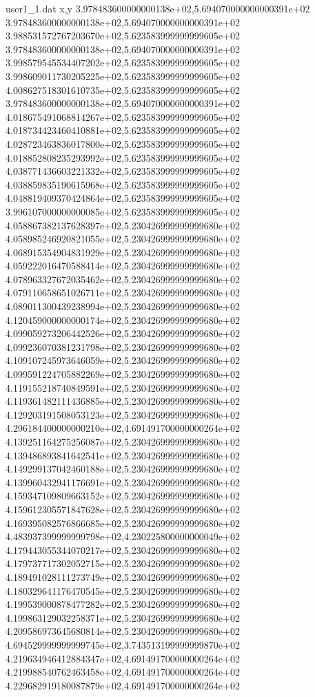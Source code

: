 \begin{filecontents}{user1_1.dat}
x,y
3.978483600000000138e+02,5.694070000000000391e+02
3.978483600000000138e+02,5.694070000000000391e+02
3.988531572767203670e+02,5.623583999999999605e+02
3.978483600000000138e+02,5.694070000000000391e+02
3.998579545534407202e+02,5.623583999999999605e+02
3.998609011730205225e+02,5.623583999999999605e+02
4.008627518301610735e+02,5.623583999999999605e+02
3.978483600000000138e+02,5.694070000000000391e+02
4.018675491068814267e+02,5.623583999999999605e+02
4.018734423460410881e+02,5.623583999999999605e+02
4.028723463836017800e+02,5.623583999999999605e+02
4.018852808235293992e+02,5.623583999999999605e+02
4.038771436603221332e+02,5.623583999999999605e+02
4.038859835190615968e+02,5.623583999999999605e+02
4.048819409370424864e+02,5.623583999999999605e+02
3.996107000000000085e+02,5.623583999999999605e+02
4.058867382137628397e+02,5.230426999999999680e+02
4.058985246920821055e+02,5.230426999999999680e+02
4.068915354904831929e+02,5.230426999999999680e+02
4.059222016470588414e+02,5.230426999999999680e+02
4.078963327672035462e+02,5.230426999999999680e+02
4.079110658651026711e+02,5.230426999999999680e+02
4.089011300439238994e+02,5.230426999999999680e+02
4.120459000000000174e+02,5.230426999999999680e+02
4.099059273206442526e+02,5.230426999999999680e+02
4.099236070381231798e+02,5.230426999999999680e+02
4.109107245973646059e+02,5.230426999999999680e+02
4.099591224705882269e+02,5.230426999999999680e+02
4.119155218740849591e+02,5.230426999999999680e+02
4.119361482111436885e+02,5.230426999999999680e+02
4.129203191508053123e+02,5.230426999999999680e+02
4.296184400000000210e+02,4.691491700000000264e+02
4.139251164275256087e+02,5.230426999999999680e+02
4.139486893841642541e+02,5.230426999999999680e+02
4.149299137042460188e+02,5.230426999999999680e+02
4.139960432941176691e+02,5.230426999999999680e+02
4.159347109809663152e+02,5.230426999999999680e+02
4.159612305571847628e+02,5.230426999999999680e+02
4.169395082576866685e+02,5.230426999999999680e+02
4.483937399999999798e+02,4.230225800000000049e+02
4.179443055344070217e+02,5.230426999999999680e+02
4.179737717302052715e+02,5.230426999999999680e+02
4.189491028111273749e+02,5.230426999999999680e+02
4.180329641176470545e+02,5.230426999999999680e+02
4.199539000878477282e+02,5.230426999999999680e+02
4.199863129032258371e+02,5.230426999999999680e+02
4.209586973645680814e+02,5.230426999999999680e+02
4.694529999999999745e+02,3.743513199999999870e+02
4.219634946412884347e+02,4.691491700000000264e+02
4.219988540762463458e+02,4.691491700000000264e+02
4.229682919180087879e+02,4.691491700000000264e+02

\end{filecontents}
